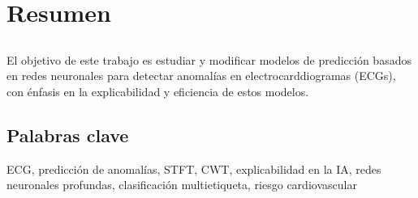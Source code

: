 \chapter*{Resumen}

\section*{\tituloPortadaVal}

El objetivo de este trabajo es estudiar y modificar modelos de predicción basados en redes neuronales para detectar anomalías en electrocarddiogramas (ECGs), con énfasis en la explicabilidad y eficiencia de estos modelos.


\section*{Palabras clave}
   
ECG, predicción de anomalías, STFT, CWT, explicabilidad en la IA, redes neuronales profundas, clasificación multietiqueta, riesgo cardiovascular
   



